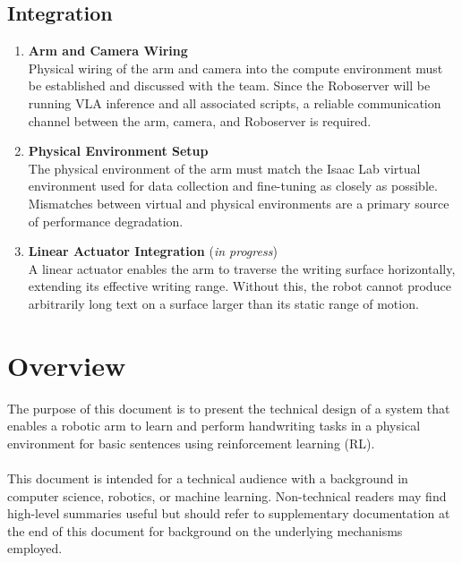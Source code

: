 \documentclass[12pt,a4paper]{article}
\begin{document}
\subsection*{Integration}

\begin{enumerate}

  \item \textbf{Arm and Camera Wiring} \\
  Physical wiring of the arm and camera into the compute environment must be established and discussed with the team. Since the Roboserver will be running VLA inference and all associated scripts, a reliable communication channel between the arm, camera, and Roboserver is required.

  \item \textbf{Physical Environment Setup} \\
  The physical environment of the arm must match the Isaac Lab virtual environment used for data collection and fine-tuning as closely as possible. Mismatches between virtual and physical environments are a primary source of performance degradation.

  \item \textbf{Linear Actuator Integration} (\textit{in progress}) \\
  A linear actuator enables the arm to traverse the writing surface horizontally, extending its effective writing range. Without this, the robot cannot produce arbitrarily long text on a surface larger than its static range of motion.

\end{enumerate}
\newpage

\section{Overview}
The purpose of this document is to present the technical design of a system that enables a robotic arm to learn and perform handwriting tasks in a physical environment for basic sentences using reinforcement learning (RL). \\\\
This document is intended for a technical audience with a background in computer science, robotics, or machine learning. Non-technical readers may find high-level summaries useful but should refer to supplementary documentation at the end of this document for background on the underlying mechanisms employed.
\newpage
\end{document}
